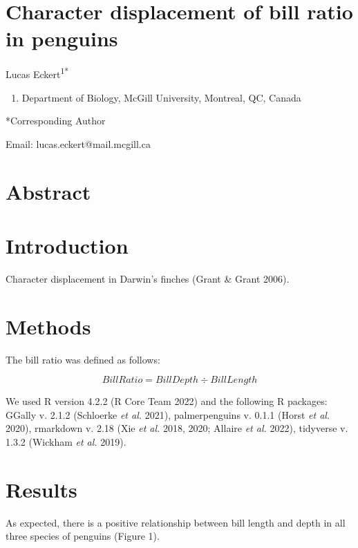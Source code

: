 \documentclass[
]{article}
\author{}
\date{\vspace{-2.5em}}
\providecommand{\tightlist}{%
  \setlength{\itemsep}{0pt}\setlength{\parskip}{0pt}}
\begin{document}
\hypertarget{character-displacement-of-bill-ratio-in-penguins}{%
\section{Character displacement of bill ratio in
penguins}\label{character-displacement-of-bill-ratio-in-penguins}}

Lucas Eckert\textsuperscript{1*}

\begin{enumerate}
\def\labelenumi{\arabic{enumi}.}
\tightlist
\item
  Department of Biology, McGill University, Montreal, QC, Canada
\end{enumerate}

*Corresponding Author

Email: lucas.eckert@mail.mcgill.ca

\hypertarget{abstract}{%
\section{Abstract}\label{abstract}}

\hypertarget{introduction}{%
\section{Introduction}\label{introduction}}

Character displacement in Darwin's finches (Grant \& Grant 2006).

\hypertarget{methods}{%
\section{Methods}\label{methods}}

The bill ratio was defined as follows:

\[
BillRatio = BillDepth \div BillLength
\]

We used R version 4.2.2 (R Core Team 2022) and the following R packages:
GGally v. 2.1.2 (Schloerke \emph{et al.} 2021), palmerpenguins v. 0.1.1
(Horst \emph{et al.} 2020), rmarkdown v. 2.18 (Xie \emph{et al.} 2018,
2020; Allaire \emph{et al.} 2022), tidyverse v. 1.3.2 (Wickham \emph{et
al.} 2019).

\hypertarget{results}{%
\section{Results}\label{results}}

As expected, there is a positive relationship between bill length and
depth in all three species of penguins (Figure 1).
\end{document}
